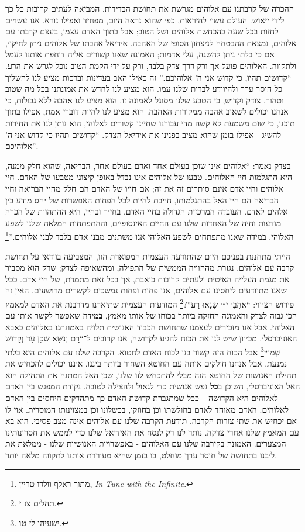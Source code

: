 \documentclass[12pt, extrafontsizes, twopage, a5paper]{memoir}
\begin{document}
ההכרה של קרבתנו עם אלוהים מגרשת את תחושת הבדידות, המביאה לעתים קרובות כל כך לידי ייאוש. העולם עשוי להיראות, כפי שהוא נראה היום, מפחיד ואפילו נורא. אנו עשויים לחזות בכל שעה בהכחשת אלוהים ושל הטוב; אבל בתוך האדם עצמו, בעצם קרבתו עם אלוהים, נמצאת ההבטחה לניצחון הסופי של האהבה. אידיאל אהבתו של אלוהים ניתן לחיקוי, אם כי בלתי ניתן להשגה, עלי אדמות; האמונה שאנו קשורים אליה דוחפת אותנו לעמל ולתקווה. האלוהים פועל אך ורק דרך צדק בלבד, ורק על ידי הקמת הטוב נוכל לגרש את הרע. ``קדושים תהיו, כי קדוש אני ה' אלוהיכם.'' זה כאילו האב בעדינות וברכות מציע לנו להשליך כל חוסר ערך ולהיוודע לברית שלנו עמו. הוא מציע לנו לחדש את אמונתנו בכל מה שטוב וטהור, צודק וקדוש, כי הטבע שלנו מסוגל לאמונה זו. הוא מציע לנו אהבה ללא גבולות, כי אנחנו יכולים לשאוב אהבה ממקורות האהבה. הוא מציע לנו להיות דוברי אמת, אפילו בתוך תוכנו, כי שום משמעת לא קשה מדי עבורנו שחיינו קשורים לאלוהי, הוא נותן לנו את החירות להשיג - אפילו בזמן שהוא מציב בפנינו את אידיאל הצדק. ``קדושים תהיו כי קדוש אני ה' אלוהיכם''.

בצדק נאמר: ``אלוהים אינו שוכן בעולם אחד ואדם בעולם אחר, \textbf{הבריאה}, שהוא חלק ממנה, היא התגלמות חיי האלוהים. טבעו של אלוהים אינו נבדל באופן קיצוני מטבעו של האדם. חיי אלוהים וחיי אדם אינם סותרים זה את זה; אם חייו של האדם הם חלק מחיי הבריאה וחיי הבריאה הם חיי האל בהתגלמותו, חייבת להיות לכל הפחות האפשרות של יחס מודע בין אלהים לאדם. העובדה המרכזית הגדולה בחיי האדם, בחייך ובחיי, היא ההתהוות של הכרה מודעות וחיה של האחדות שלנו עם החיים האינסופיים, וההתפתחות המלאה שלנו  לשפע האלוהי. במידה שאנו מתפתחים לשפע האלוהי אנו משתנים מבני אדם בלבד לבני אלוהים.''\footnote{מתוך ראלף וולדו טריין, \textsl{\textenglish{In Tune with the Infinite}}.}

הייתי מתחננת בפניכם היום שהתודעה העצמית המפוארת הזו, המצביעה בוודאי על תחושת קרבה עם אלוהים, נגזרת מהחוויה הממשית של התפילה, ומהשאיפה לצדק; שרק הוא מסביר את מגמת העלייה האיטית ולעתים קרובות כואבת, אך בכל זאת מתמדת, של חיי אדם. ככל שאנו מתוודעים ליחסינו עם אלוהים, אנו פחות ופחות נמשכים לקשרים מרושעים. האין זה פירוש הציווי: ``אֹהֲבֵי י״י שִׂנְאוּ רָע''?\footnote{תהלים צז י.} המודעות העצמית שתיארנו מדרבנת את האדם למאמץ הכי גבוה לצדק והאמונה החזקה ביותר בכוחו של אותו מאמץ, \textbf{במידה} שאפשר לקשר אותו עם האלוהי. אבל אנו מזכירים לעצמנו שתחושת הכבוד האנושית תלויה באמונתנו באלוהים כאבא האוניברסלי. מכיוון שיש לנו את הכוח להגיע לקדושה, אנו קרובים ל־``רָם וְנִשָּׂא שֹׁכֵן עַד וְקָדוֹשׁ שְׁמוֹ``\footnote{ישעיהו לז טו.} אבל הכוח הזה קשור בנו לכוח האדם לחטוא. הקרבה שלנו עם אלוהים היא בלתי נמנעת, אבל אנחנו חולקים אותה עם החוטא השחור ביותר ביננו. איננו יכולים להכחיש את תהילת האנושות של החוטא הזה מבלי להתכחש לזו שלנו, שכן האל המתנה את התהילה הוא האל האוניברסלי, השוכן ב\textbf{כל} נפש אנושית כדי לגאול ולהצילה לטובה. נקודת המפגש בין האדם לאלוהים היא הקדושה – ככל שמתגברת קדושת האדם כך מתהדקים היחסים בין האדם לאלוהים. האדם מאוחד לאדם בחולשתו וכן בחוזקו, בכשלונו וכן במצוינותו המוסרית. אוי לו אם יכחיש את שתי צורות הקרבה. \textbf{תודעת} הקרבה שלנו עם אלוהים אינה מצב פסיבי. הוא בא עם המאמץ שלנו אחרי צדקה. נותר לנו רק לנסח את האידיאל שלנו כדי לממש את חסרונותינו המצערים. האמונה בקירבה שלנו עם האלוהים - באפשרויות האנושיות שלנו - ממלאת את ליבנו בתחושה של חוסר ערך מוחלט, בו בזמן שהיא מעוררת אותנו לתקווה מלאה יותר.
\end{document}
